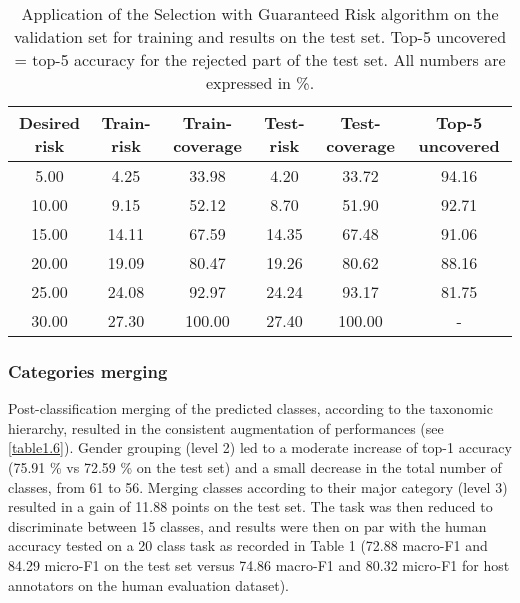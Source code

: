 \begin{table}[htbp]
  \centering
  \normalsize
  \caption[Application of the Selection with Guaranteed Risk algorithm on the validation set for training and results on the test set]{Application of the Selection with Guaranteed Risk algorithm on the validation set for training and results on the test set. Top-5 uncovered = top-5 accuracy for the rejected part of the test set. All numbers are expressed in \%.}
  \label{table1.5}
    \begin{tabular}{@{}cccccc@{}}
        \toprule
        \textbf{Desired risk} & \textbf{Train-risk} & \textbf{Train-coverage} & \textbf{Test-risk} & \textbf{Test-coverage} & \textbf{Top-5 uncovered} \\ \midrule
        5.00                  & 4.25                & 33.98                   & 4.20               & 33.72                  & 94.16                    \\
        10.00                 & 9.15                & 52.12                   & 8.70               & 51.90                  & 92.71                    \\
        15.00                 & 14.11               & 67.59                   & 14.35              & 67.48                  & 91.06                    \\
        20.00                 & 19.09               & 80.47                   & 19.26              & 80.62                  & 88.16                    \\
        25.00                 & 24.08               & 92.97                   & 24.24              & 93.17                  & 81.75                    \\
        30.00                 & 27.30               & 100.00                  & 27.40              & 100.00                 & -                        \\ \bottomrule
    \end{tabular}
\end{table}

\subsubsection{Categories merging}\label{chapitre1_6.3.2}
Post-classification merging of the predicted classes, according to the taxonomic hierarchy, resulted in the consistent augmentation of performances (see \autoref{table1.6}). Gender grouping (level 2) led to a moderate increase of top-1 accuracy (75.91 \% vs 72.59 \% on the test set) and a small decrease in the total number of classes, from 61 to 56. Merging classes according to their major category (level 3) resulted in a gain of 11.88 points on the test set. The task was then reduced to discriminate between 15 classes, and results were then on par with the human accuracy tested on a 20 class task as recorded in Table 1 (72.88 macro-F1 and 84.29 micro-F1 on the test set versus 74.86 macro-F1 and 80.32 micro-F1 for host annotators on the human evaluation dataset).

